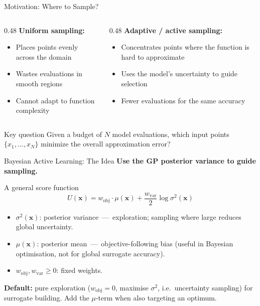 \documentclass[aspectratio=169,11pt]{beamer}
\newcommand{\emphc}[1]{\textcolor{harvardcrimson}{#1}}
\newcommand{\x}{\bm{x}}
\begin{document}
\begin{frame}{Motivation: Where to Sample?}
\begin{columns}[T]
\begin{column}{0.48\textwidth}
\textbf{Uniform sampling:}
\begin{itemize}
  \item Places points evenly across the domain
  \item Wastes evaluations in smooth regions
  \item Cannot adapt to function complexity
\end{itemize}
\end{column}
\begin{column}{0.48\textwidth}
\textbf{Adaptive / active sampling:}
\begin{itemize}
  \item Concentrates points where the function is \emphc{hard to approximate}
  \item Uses the model's \emphc{uncertainty} to guide selection
  \item Fewer evaluations for the same accuracy
\end{itemize}
\end{column}
\end{columns}

\vspace{0.5cm}
\begin{alertblock}{Key question}
Given a budget of $N$ model evaluations, which input points $\{x_1, \dots, x_N\}$ minimize the overall approximation error?
\end{alertblock}
\end{frame}

\begin{frame}{Bayesian Active Learning: The Idea}
\textbf{Use the GP posterior variance to guide sampling.}

\vspace{0.2cm}
\begin{block}{A general score function}
\vspace{-4pt}
\[
U(\x) = w_{\mathrm{obj}} \cdot \mu(\x) + \frac{w_{\mathrm{var}}}{2}\log\sigma^2(\x)
\]
\vspace{-8pt}
\begin{itemize}\setlength{\itemsep}{1pt}\small
  \item $\sigma^2(\x)$: posterior variance \,---\, \emphc{exploration}; sampling where large reduces global uncertainty.
  \item $\mu(\x)$: posterior mean \,---\, \emphc{objective-following} bias (useful in Bayesian optimisation, not for global surrogate accuracy).
  \item $w_{\mathrm{obj}}, w_{\mathrm{var}} \geq 0$: fixed weights.
\end{itemize}
\end{block}

\vspace{0.1cm}
{\small\textbf{Default:} pure exploration ($w_{\mathrm{obj}} = 0$, maximise $\sigma^2$, i.e.\ uncertainty sampling) for surrogate building. Add the $\mu$-term when also targeting an optimum.}
\end{frame}
\end{document}
